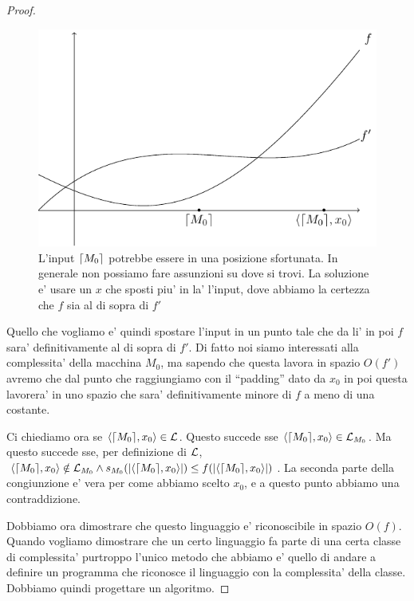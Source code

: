 \begin{proof}
    \begin{figure}[h]
        \begin{center}
            \includegraphics{./img/spacehierarchy.pdf}
            \caption{L'input $\lceil M_{0} \rceil$ potrebbe essere in una posizione sfortunata. In generale
            non possiamo fare assunzioni su dove si trovi. La soluzione e' usare un $x$ che sposti
            piu' in la' l'input, dove abbiamo la certezza che $f$ sia al di sopra di $f'$}
            \label{img:spacehierarchy}
        \end{center}
    \end{figure}

    Quello che vogliamo e' quindi spostare l'input in un punto tale che da li' in poi $f$ sara'
    definitivamente al di sopra di $f'$. Di fatto noi siamo interessati alla complessita' della
    macchina $M_{0}$, ma sapendo che questa lavora in spazio $O(f')$ avremo che dal punto che
    raggiungiamo con il ``padding'' dato da $x_{0}$ in poi questa lavorera' in uno spazio che sara'
    definitivamente minore di $f$ a meno di una costante.

    Ci chiediamo ora se $\langle \lceil M_{0} \rceil, x_{0} \rangle \in \mathcal{L}$. Questo succede sse
    $\langle \lceil M_{0} \rceil, x_{0} \rangle \in \mathcal{L}_{M_{0}}$. Ma questo succede sse, per definizione di
    $\mathcal{L}$, $\langle \lceil M_{0} \rceil, x_{0} \rangle \notin \mathcal{L}_{M_{0}} \land
    s_{M_{0}}(|\langle \lceil M_{0} \rceil, x_{0} \rangle|) \leq f(|\langle \lceil M_{0} \rceil, x_{0} \rangle|)$. La seconda parte
    della congiunzione e' vera per come abbiamo scelto $x_{0}$, e a questo punto abbiamo una
    contraddizione.

    Dobbiamo ora dimostrare che questo linguaggio e' riconoscibile in spazio $O(f)$. Quando vogliamo
    dimostrare che un certo linguaggio fa parte di una certa classe di complessita' purtroppo l'unico
    metodo che abbiamo e' quello di andare a definire un programma che riconosce il linguaggio con la
    complessita' della classe. Dobbiamo quindi progettare un algoritmo.


\end{proof}
